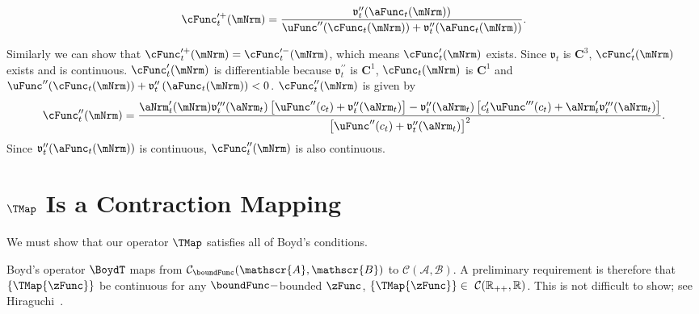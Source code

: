 \documentclass[\econtexRoot/BufferStockTheory]{subfiles}
\begin{document}
\begin{equation*}
\cFunc_{t}^{\prime +}(\mNrm)=\frac{\mathfrak{v}_{t}^{\prime \prime }({\aFunc}_{t}(\mNrm))}{\uFunc^{\prime \prime
}(\cFunc_{t}(\mNrm))+\mathfrak{v}_{t}^{\prime \prime }({\aFunc}_{t}(\mNrm))}.
\end{equation*}

Similarly we can show that $\cFunc_{t}^{\prime +}(\mNrm)=\cFunc_{t}^{\prime -}(\mNrm)$,
which means $\cFunc_{t}^{\prime }(\mNrm)$ exists. Since $\mathfrak{v}_{t}$ is
$\mathbf{C}^{3}$, $ \cFunc_{t}^{\prime }(\mNrm)$ exists and is continuous.
$\cFunc_{t}^{\prime }(\mNrm)$ is differentiable because
$\mathfrak{v}_{t}^{\prime \prime }$ is $\mathbf{C}^{1}$, $ \cFunc_{t}(\mNrm)$
is $\mathbf{C}^{1}$ and $\uFunc^{\prime \prime
}(\cFunc_{t}(\mNrm))+\mathfrak{v}_{t}^{\prime \prime }\left( {\aFunc}_{t}(\mNrm)\right)
<0$. $\cFunc_{t}^{\prime \prime }(\mNrm)$ is given by
\begin{equation}
\cFunc_{t}^{\prime \prime }(\mNrm)=\frac{{\aNrm}_{t}^{\prime }(\mNrm)\mathfrak{v}_{t}^{\prime \prime
\prime }({\aNrm}_{t})\left[ \uFunc^{\prime \prime }(c_{t})+\mathfrak{v}_{t}^{\prime \prime }({\aNrm}_{t})
\right] -\mathfrak{v}_{t}^{\prime \prime }({\aNrm}_{t})\left[ c_{t}^{\prime }\uFunc^{\prime \prime
\prime }(c_{t})+{\aNrm}_{t}^{\prime }\mathfrak{v}_{t}^{\prime \prime \prime }({\aNrm}_{t})\right] }{
{\left[ \uFunc^{\prime \prime }(c_{t})+\mathfrak{v}_{t}^{\prime \prime }({\aNrm}_{t})\right]}^{2}}.
\end{equation}
Since $\mathfrak{v}_{t}^{\prime \prime }({\aFunc}_{t}(\mNrm))$ is continuous,
$\cFunc_{t}^{\prime \prime }(\mNrm)$ is also continuous.

\hypertarget{It-Is-A-Contraction-Mapping}{}
\section{\texorpdfstring{$\TMap$}{T} Is a Contraction Mapping}\label{sec:Tcomplete}

We must show that our operator $\TMap$ satisfies all of Boyd's
conditions.

Boyd's operator $\BoydT$ maps from $\mathcal{C}_{\boundFunc}(\mathscr{A},\mathscr{B})$ to $\mathcal{C}(\mathscr{A},\mathscr{B})$. A preliminary requirement is therefore that $\{\TMap{\zFunc}\}$ be continuous for any $\boundFunc-$bounded $\zFunc$, $\{\TMap{\zFunc}\}\in~\mathcal{C}(\mathbb{R}_{++},\mathbb{R})$.  This is not difficult to show; see Hiraguchi~\citeyearpar{hiraguchiBSProofs}.
\end{document}
